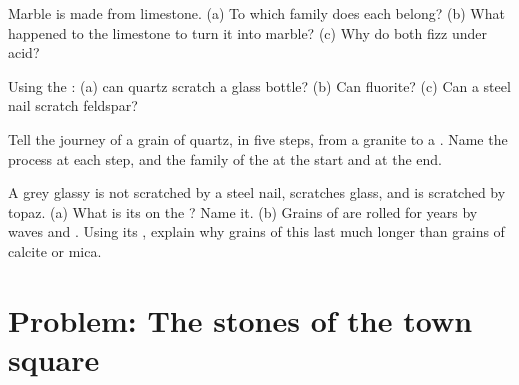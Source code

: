 \begin{exercise}[$\star\star$]\label{exo:g6:rocks-and-minerals:9}
Marble is made from limestone. (a) To which family does each belong?
(b) What happened to the limestone to turn it into marble? (c) Why do both
fizz under acid?
\end{exercise}

\begin{exercise}[$\star\star$]\label{exo:g6:rocks-and-minerals:10}
Using the : (a) can quartz scratch a glass bottle? (b) Can
fluorite? (c) Can a steel nail scratch feldspar?
\end{exercise}

\begin{exercise}[$\star\star\star$]\label{exo:g6:rocks-and-minerals:11}
Tell the journey of a grain of quartz, in five steps, from a granite
 to a . Name the process at each step, and the
family of the  at the start and at the end.
\end{exercise}

\begin{exercise}[$\star\star\star$]\label{exo:g6:rocks-and-minerals:12}
A grey glassy  is not scratched by a steel nail, scratches glass,
and is scratched by topaz. (a) What is its  on the ?
Name it. (b) Grains of  are rolled for years by waves and . Using
its , explain why grains of this  last much longer than
grains of calcite or mica.
\end{exercise}

\section{Problem: The stones of the town square}


